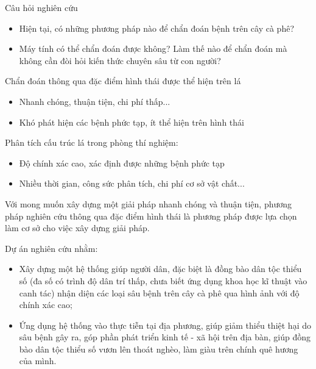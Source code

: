 \documentclass{beamer}
\begin{document}
\begin{frame}[allowframebreaks]{Câu hỏi nghiên cứu}
	\begin{itemize}
		\item Hiện tại, có những phương pháp nào để chẩn đoán bệnh trên cây cà phê? 
		\item Máy tính có thể chẩn đoán được không? Làm thế nào để chẩn đoán mà không cần đòi hỏi kiến thức chuyên sâu từ con người?
	\end{itemize}

	\framebreak

	Chẩn đoán thông qua đặc điểm hình thái được thể hiện trên lá
	\begin{itemize}
		\item Nhanh chóng, thuận tiện, chi phí thấp...
		\item Khó phát hiện các bệnh phức tạp, ít thể hiện trên hình thái
	\end{itemize}

	Phân tích cấu trúc lá trong phòng thí nghiệm:
	\begin{itemize}
		\item Độ chính xác cao, xác định được những bệnh phức tạp
		\item Nhiều thời gian, công sức phân tích, chi phí cơ sở vật chất...
	\end{itemize}

	\framebreak
	Với mong muốn xây dựng một giải pháp nhanh chóng và thuận tiện, phương pháp nghiên cứu thông qua đặc điểm hình thái là phương pháp được lựa chọn làm cơ sở cho việc xây dựng giải pháp.

	\framebreak

	Dự án nghiên cứu nhằm:

	\begin{itemize}
		\item Xây dựng một hệ thống giúp người dân, đặc biệt là đồng bào dân tộc thiểu số (đa số có trình độ dân trí thấp, chưa biết ứng dụng khoa học kĩ thuật vào canh tác) nhận diện các loại sâu bệnh trên cây cà phê qua hình ảnh với độ chính xác cao;
		\item Ứng dụng hệ thống vào thực tiễn tại địa phương, giúp giảm thiểu thiệt hại do sâu bệnh gây ra, góp phần phát triển kinh tế - xã hội trên địa bàn, giúp đồng bào dân tộc thiểu số vươn lên thoát nghèo, làm giàu trên chính quê hương của mình.
	\end{itemize}

\end{frame}
\end{document}
